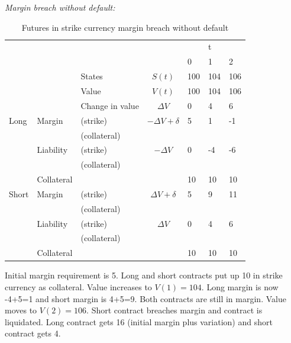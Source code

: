 \documentclass[12pt]{article}
\begin{document}
\textit{Margin breach without default:}
\begin{table}
\begin{tabular}{lll|c|lll}
&  &  &  &  & t &\\  
&  &  &  & 0 & 1 & 2\\
\hline
\hline
&  & States &  $S(t)$ & 100 & 104 & 106\\
&  & Value  &  $V(t)$  & 100 & 104 & 106 \\
&  & Change in value & $\Delta V$ & 0& 4 & 6 \\
\hline
Long      & Margin    & (strike)     & $-\Delta V + \delta$ & 5 & 1 & -1 \\
          &           & (collateral) & & & &\\ 
          & Liability & (strike)     & $-\Delta V$ & 0 & -4 & -6\\ 
          &           & (collateral)& & & &\\
          & Collateral&                       &    & 10 & 10 & 10\\          
\hline          
Short     & Margin    & (strike)     & $\Delta V + \delta$ & 5 & 9 & 11\\
          &           & (collateral) & & & &\\
          & Liability & (strike)     & $\Delta V$ & 0 & 4 & 6\\
          &           & (collateral) & & & &\\
          & Collateral&                       &    & 10 & 10 & 10\\ 
          

\end{tabular}
\caption{Futures in strike currency margin breach without default}
\label{fut}
\end{table}

Initial margin requirement is 5. Long and short contracts put up 10 in strike currency as collateral. Value increases to $V(1) = 104$. Long margin is now -4+5=1 and short margin is 4+5=9. Both contracts are still in margin. Value moves to $V(2)=106$. Short contract breaches margin and contract is liquidated. Long contract gets 16 (initial margin plus variation) and short contract gets 4.
\end{document}

